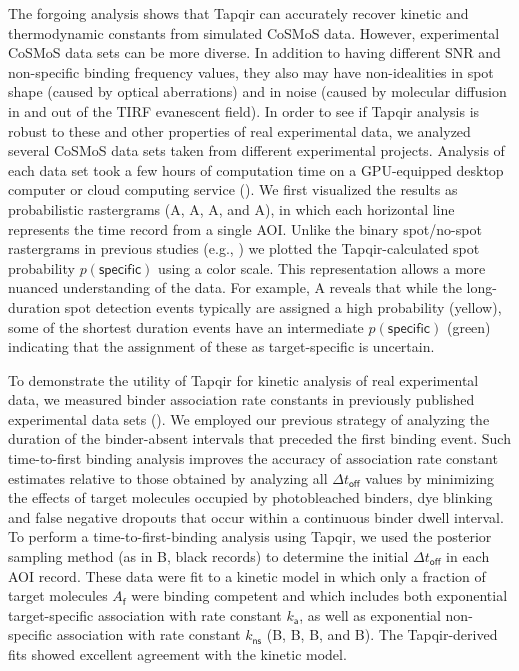 The forgoing analysis shows that Tapqir can accurately recover kinetic and thermodynamic constants from simulated CoSMoS data.  However, experimental CoSMoS data sets can be more diverse.  In addition to having different SNR and non-specific binding frequency values, they also may have non-idealities in spot shape (caused by optical aberrations) and in noise (caused by molecular diffusion in and out of the TIRF evanescent field).  In order to see if Tapqir analysis is robust to these and other properties of real experimental data, we analyzed several CoSMoS data sets taken from different experimental projects. Analysis of each data set took a few hours of computation time on a GPU-equipped desktop computer or cloud computing service (). We first visualized the results as probabilistic rastergrams (A, A, A, and A), in which each horizontal line represents the time record from a single AOI.  Unlike the binary spot/no-spot rastergrams in previous studies (e.g., \cite{Friedman2013-sf,Rosen2020-zn}) we plotted the Tapqir-calculated spot probability $p(\mathsf{specific})$ using a color scale.  This representation allows a more nuanced understanding of the data.  For example, A reveals that while the long-duration spot detection events typically are assigned a high probability (yellow), some of the shortest duration events have an intermediate $p(\mathsf{specific})$ (green) indicating that the assignment of these as target-specific is uncertain.  



To demonstrate the utility of Tapqir for kinetic analysis of real experimental data, we measured binder association rate constants in previously published experimental data sets ().  We employed our previous strategy  \citep{Friedman2012-if,Friedman2015-nx} of analyzing the duration of the binder-absent intervals that preceded the first binding event.  Such time-to-first binding analysis improves the accuracy of association rate constant estimates relative to those obtained by analyzing all $\Delta t_\mathsf{off}$ values by minimizing the effects of target molecules occupied by photobleached binders, dye blinking and false negative dropouts that occur within a continuous binder dwell interval.  To perform a time-to-first-binding analysis using Tapqir, we used the posterior sampling method (as in B, black records) to determine the initial $\Delta t_\mathsf{off}$ in each AOI record. These data were fit to a kinetic model \citep{Friedman2012-if,Friedman2015-nx} in which only a fraction of target molecules $A_\mathsf{f}$ were binding competent and which includes both exponential target-specific association with rate constant $k_\mathsf{a}$, as well as exponential non-specific association with rate constant $k_\mathsf{ns}$ (B, B, B, and B).  The Tapqir-derived fits showed excellent agreement with the kinetic model.  

